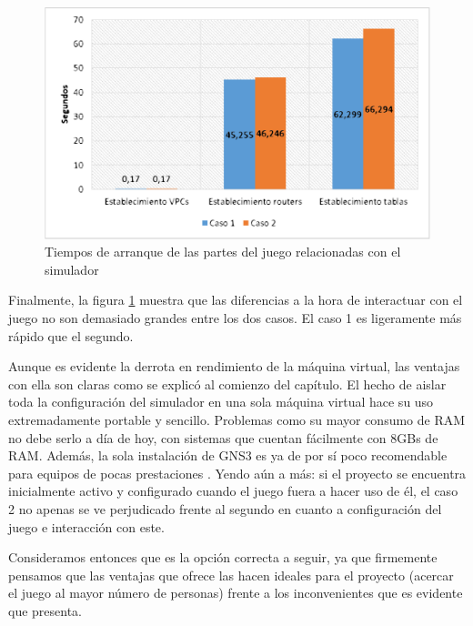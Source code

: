 \begin{figure}[H]
  \centering
  \includegraphics[scale=0.4]{imagenes/arranquejuego}
  \caption{Tiempos de arranque de las partes del juego relacionadas con el simulador}
  \label{fig:arranquejuego}
\end{figure}

Finalmente, la figura \ref{fig:arranquejuego} muestra que las diferencias a la hora de interactuar con el juego no son demasiado grandes entre los dos casos. El caso 1 es ligeramente más rápido que el segundo.

Aunque es evidente la derrota en rendimiento de la máquina virtual, las ventajas con ella son claras como se explicó al comienzo del capítulo. El hecho de aislar toda la configuración del simulador en una sola máquina virtual hace su uso extremadamente portable y sencillo. Problemas como su mayor consumo de RAM no debe serlo a día de hoy, con sistemas que cuentan fácilmente con 8GBs de RAM. Además, la sola instalación de GNS3 es ya de por sí poco recomendable para equipos de pocas prestaciones \cite{gnsweb}. Yendo aún a más: si el proyecto se encuentra inicialmente activo y configurado cuando el juego fuera a hacer uso de él, el caso 2 no apenas se ve perjudicado frente al segundo en cuanto a configuración del juego e interacción con este.

Consideramos entonces que es la opción correcta a seguir, ya que firmemente pensamos que las ventajas que ofrece las hacen ideales para el proyecto (acercar el juego al mayor número de personas) frente a los inconvenientes que es evidente que presenta.